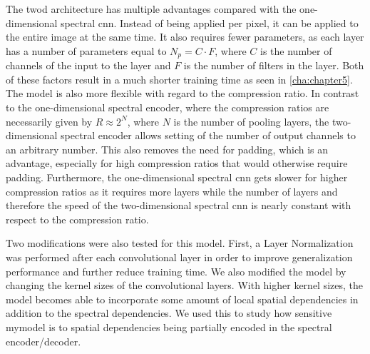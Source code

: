 The \ac{twod} architecture has multiple advantages compared with the one-dimensional spectral \ac{cnn}. Instead of being applied per pixel, it can be applied to the entire image at the same time. It also requires fewer parameters, as each layer has a number of parameters equal to $N_p = C \cdot F$, where $C$ is the number of channels of the input to the layer and $F$ is the number of filters in the layer. Both of these factors result in a much shorter training time as seen in \autoref{cha:chapter5}. The model is also more flexible with regard to the compression ratio. In contrast to the one-dimensional spectral encoder, where the compression ratios are necessarily given by $R \approx 2^N$, where $N$ is the number of pooling layers, the two-dimensional spectral encoder allows setting of the number of output channels to an arbitrary number. This also removes the need for padding, which is an advantage, especially for high compression ratios that would otherwise require padding. Furthermore, the one-dimensional spectral \ac{cnn} gets slower for higher compression ratios as it requires more layers while the number of layers and therefore the speed of the two-dimensional spectral \ac{cnn} is nearly constant with respect to the compression ratio.

Two modifications were also tested for this model. First, a Layer Normalization was performed after each convolutional layer in order to improve generalization performance and further reduce training time.  We also modified the model by changing the kernel sizes of the convolutional layers. With higher kernel sizes, the model becomes able to incorporate some amount of local spatial dependencies in addition to the spectral dependencies. We used this to study how sensitive \ac{mymodel} is to spatial dependencies being partially encoded in the spectral encoder/decoder.
